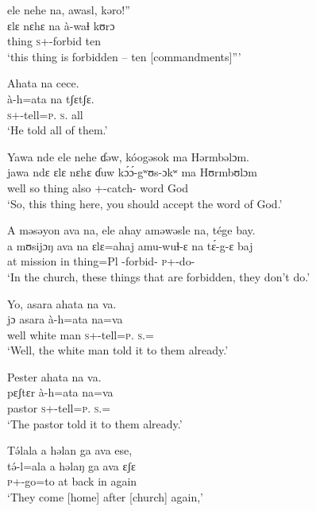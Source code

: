  \medskip
 ele nehe na, awasl, kəro!”\\
 \gll ɛlɛ       nɛhɛ     na     à-waɬ    kʊrɔ\\
 thing    {\DEM}     {\PSP}   \textsc{s}+{\PFV}-forbid    ten\\
 \glt ‘this thing is forbidden – ten [commandments]”’\\
\z

\ea   Ahata  na  cece.\\
 \gll à-h=ata   na   tʃɛtʃɛ.\\
 \textsc{s}+{\PFV}-tell=\textsc{p}.{\IO}  \textsc{s}.{\DO}  all\\
 \glt ‘He told all of them.’ 
 \z

\ea Yawa  nde  ele  nehe  ɗəw,  kóogəsok ma  Hərmbəlɔm.  \\
 \gll jawa  ndɛ  ɛlɛ   nɛhɛ   ɗuw k\'ɔ\'ɔ-gʷʊs-ɔkʷ ma   Hʊrmbʊlɔm\\
 well    so  thing  {\DEM}  also  {\twoS}+{\POT}-catch-{\twoP}    word  God\\
 \glt ‘So, this thing here, you should accept the word of God.’ 
 \z

\ea A  məsəyon  ava  na,  ele  ahay  aməwəsle  na,  tége  bay.\\
 \gll a  mʊsijɔŋ    ava   na  ɛlɛ=ahaj  amu-wuɬ-ɛ     na   t\'ɛ-g-ɛ     baj\\
 at  mission    in  {\PSP}  thing=Pl        {\DEP}-forbid-{\CL}   {\PSP}  \textsc{p}+{\IFV}-do-{\CL}  {\NEG}\\
 \glt ‘In the church, these things that are forbidden, they don’t do.’
 \z

\ea Yo, asara  ahata  na  va.    \\
 \gll jɔ     asara     à-h=ata  na=va \\
 well {white man}  \textsc{s}+{\PFV}-tell=\textsc{p}.{\IO}  \textsc{s}.{\DO}={\PRF}\\
 \glt ‘Well, the white man told it to them already.’ 
 \z

\ea Pester  ahata  na  va.  \\
 \gll pɛʃtɛr   à-h=ata   na=va\\
 pastor  \textsc{s}+{\PFV}-tell=\textsc{p}.{\IO}  \textsc{s}.{\DO}={\PRF}\\
 \glt ‘The pastor told it to them already.’ 
 \z

\ea T\'əlala a  həlan  ga  ava  ese,   \\
 \gll t\'ə-l=ala   a   həlaŋ  ga   ava   ɛʃɛ   \\
 \textsc{p}+{\IFV}-go=to  at  back  {\ADJ}  in  again  \\
 \glt ‘They come [home] after [church] again,’\\
 
